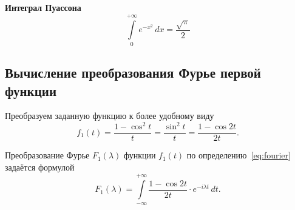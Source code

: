 \documentclass[a4paper, 11pt]{article}
\newcommand{\myint}[4]{\int\limits_{#1}^{#2}#3\,d#4}
\begin{document}
        \textbf{Интеграл Пуассона}
        \begin{equation} \label{eq:puasson}
        \myint{0}{+\infty}{e^{-x^2}}{x} = \frac{\sqrt{\pi}}{2}
        \end{equation}
             
        

    \subsection{Вычисление преобразования Фурье первой функции}
        Преобразуем заданную функцию к более удобному виду
        $$
            f_1(t) = \frac{1-\cos^2t}{t} = \frac{\sin^2t}{t} = \frac{1 - \cos2t}{2t}.
        $$
        
        Преобразование Фурье $F_1(\lambda)$ функции $f_1(t)$ по определению~\eqref{eq:fourier} задаётся формулой
        $$
            F_1(\lambda) = \myint{-\infty}{+\infty}{\frac{1 - \cos2t}{2t}\cdot e^{-i\lambda t}}{t}. 
        $$
        
\end{document}
